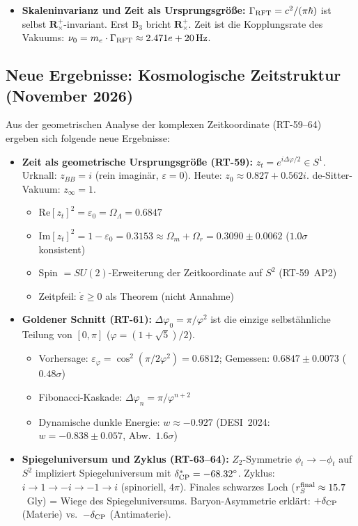 \documentclass[12pt]{iopart}
\providecommand{\mathbb}[1]{\mathbf{#1}}
\begin{document}
\begin{itemize}
\begin{itemize}
		\item \textbf{Skaleninvarianz und Zeit als Ursprungsgr\"o\ss{}e:}
		$\Gamma_{\rm RFT}=c^2/(\pi\hbar)$ ist selbst $\mathbb{R}^+_\times$-invariant.
		Erst B$_3$ bricht $\mathbb{R}^+_\times$. Zeit ist die Kopplungsrate des Vakuums:
		$\nu_0 = m_e \cdot \Gamma_{\rm RFT} \approx 2.471e+20\,{\rm Hz}$.
		\end{itemize}
	\end{itemize}
	
	\subsection{Neue Ergebnisse: Kosmologische Zeitstruktur (November 2026)}
	\label{sec:zeit_geometrisch}
	
	Aus der geometrischen Analyse der komplexen Zeitkoordinate (RT-59--64)
	ergeben sich folgende neue Ergebnisse:
	
	\begin{itemize}
		\item \textbf{Zeit als geometrische Ursprungsgr\"o\ss{}e (RT-59):}
		$z_t = e^{i\Delta\varphi/2} \in S^1$. Urknall: $z_{BB}=i$ (rein imagin\"ar,
		$\varepsilon=0$). Heute: $z_0\approx 0.827+0.562i$. de-Sitter-Vakuum: $z_\infty=1$.
		\begin{itemize}
			\item $\mathrm{Re}[z_t]^2 = \varepsilon_0 = \Omega_\Lambda = 0.6847$
			\item $\mathrm{Im}[z_t]^2 = 1-\varepsilon_0 = 0.3153 \approx \Omega_m+\Omega_r = 0.3090\pm0.0062$
			($1.0\sigma$ konsistent)
			\item Spin $= SU(2)$-Erweiterung der Zeitkoordinate auf $S^2$ (RT-59~AP2)
			\item Zeitpfeil: $\dot\varepsilon\geq0$ als Theorem (nicht Annahme)
		\end{itemize}
		
		\item \textbf{Goldener Schnitt (RT-61):}
		$\Delta\varphi_0 = \pi/\varphi^2$ ist die einzige selbst\"ahnliche Teilung von $[0,\pi]$
		($\varphi=(1+\sqrt5)/2$).
		\begin{itemize}
			\item Vorhersage: $\varepsilon_\varphi = \cos^2(\pi/2\varphi^2) = 0.6812$;
			Gemessen: $0.6847\pm0.0073$ ($0.48\sigma$)
			\item Fibonacci-Kaskade: $\Delta\varphi_n=\pi/\varphi^{n+2}$
			\item Dynamische dunkle Energie: $w\approx-0.927$ (DESI~2024: $w=-0.838\pm0.057$,
			Abw.\ $1.6\sigma$)
		\end{itemize}
		
		\item \textbf{Spiegeluniversum und Zyklus (RT-63--64):}
		$Z_2$-Symmetrie $\phi_t\to-\phi_t$ auf $S^2$ impliziert Spiegeluniversum mit
		$\delta_{\rm CP}^*=-68.32^\circ$. Zyklus: $i\to1\to{-i}\to{-1}\to i$ (spinoriell, $4\pi$).
		Finales schwarzes Loch ($r_S^{\rm final}\approx15.7$~Gly) = Wiege des Spiegeluniversums.
		Baryon-Asymmetrie erkl\"art: $+\delta_{\rm CP}$ (Materie) vs.\ $-\delta_{\rm CP}$ (Antimaterie).
	\end{itemize}
\end{document}
